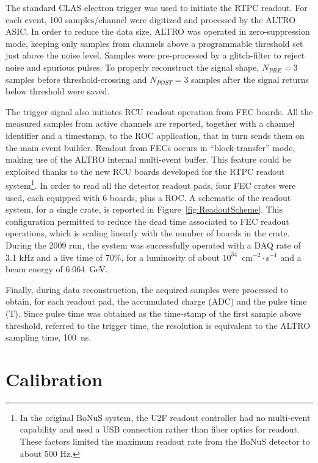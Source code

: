 \documentclass[preprint,5p]{elsarticle}
\begin{document}
The standard CLAS electron trigger was used to initiate the RTPC readout. For each 
event, 100 samples/channel were digitized and processed by the ALTRO ASIC. In order 
to reduce the data size, ALTRO was operated in zero-suppression mode, keeping only 
samples from channels above a programmable threshold set just above the noise level. 
Samples were pre-processed 
by a glitch-filter to reject noise and spurious pulses. To properly reconstruct the 
signal shape, $N_{PRE}=3$ samples before threshold-crossing and $N_{POST}=3$ samples 
after the signal returns below threshold were saved.

The trigger signal also initiates RCU readout operation from FEC boards. All the 
measured samples from active channels are reported, together with a channel 
identifier and a timestamp, to the ROC application, that in turn sends them on 
the main event builder. Readout from FECs occurs in ``block-transfer'' mode, 
making use of the ALTRO internal multi-event buffer. This feature could be 
exploited thanks to the new RCU boards developed for the RTPC readout 
system\footnote{In the original BoNuS system, the U2F readout controller had no 
   multi-event capability and used a USB connection rather than fiber optics 
   for readout. These factors limited the maximum readout rate from the BoNuS 
detector to about 500 Hz.}. In order to read all the detector readout pads, 
four FEC crates were used, each equipped with 6 boards, plus a ROC. A schematic 
of the readout system, for a single crate, is reported in 
Figure~\ref{fig:ReadoutScheme}. This configuration permitted to reduce the dead 
time associated to FEC readout operations, which is scaling linearly with the 
number of boards in the crate. During the 2009 run, the system was successfully 
operated with a DAQ rate of 3.1 kHz and a live time of $70 \%$, for a 
luminosity of about $10^{34}$~cm$^{-2}\cdot$s$^{-1}$ and a beam energy of 
6.064~GeV.

Finally, during data reconstruction, the acquired samples were processed to obtain, 
for each readout pad, the accumulated charge (ADC) and the pulse time (T). Since 
pulse time was obtained as the time-stamp of the first sample above threshold, 
referred to the trigger time, the resolution is equivalent to the ALTRO 
sampling time, 100~ns.

\section{Calibration} \label{sec_calib}
\end{document}
